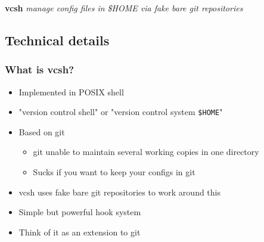 \documentclass[t]{beamer}
\begin{document}
\begin{frame}
		\begin{center}
			\vfill
			\vfill
			\textbf{vcsh}
			\vfill
			\textit{manage config files in \$HOME via fake bare git repositories}
			\vfill
			\vfill
		\end{center}
\end{frame}

\subsection{Technical details}

\begin{frame}
	\frametitle{What is vcsh?}
	\begin{itemize}
		\item Implemented in POSIX shell
		\item "version control shell" or "version control system \texttt{\$HOME}"
		\item Based on git
		\begin{itemize}
			\item git unable to maintain several working copies in one directory
			\item Sucks if you want to keep your configs in git
		\end{itemize}
		\item vcsh uses fake bare git repositories to work around this
		\item Simple but powerful hook system
		\item Think of it as an extension to git
	\end{itemize}
\end{frame}
\end{document}
